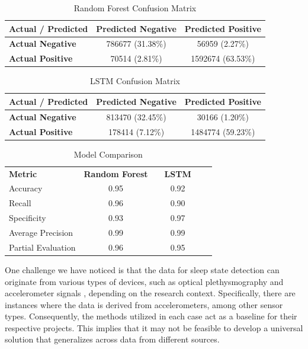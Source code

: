 \documentclass{article}
\begin{document}
\begin{table}[h]
    \centering
    \caption{Random Forest Confusion Matrix}
    \label{tab:random_forest_confusion_matrix}
    \begin{tabular}{lcc}
        \hline
        \textbf{Actual / Predicted} & \textbf{Predicted Negative} & \textbf{Predicted Positive} \\
        \hline
        \textbf{Actual Negative} & 786677 (31.38\%) & 56959 (2.27\%) \\
        \textbf{Actual Positive} & 70514 (2.81\%) & 1592674 (63.53\%) \\
        \hline
    \end{tabular}
\end{table}


\begin{table}[h]
    \centering
    \caption{LSTM Confusion Matrix}
    \label{tab:lstm_confusion_matrix}
    \begin{tabular}{lcc}
        \hline
        \textbf{Actual / Predicted} & \textbf{Predicted Negative} & \textbf{Predicted Positive} \\
        \hline
        \textbf{Actual Negative} & 813470 (32.45\%) & 30166 (1.20\%) \\
        \textbf{Actual Positive} & 178414 (7.12\%) & 1484774 (59.23\%) \\
        \hline
    \end{tabular}
\end{table}

\begin{table}[h]
    \centering
    \caption{Model Comparison}
    \label{tab:model_comparison}
    \begin{tabular}{lccccc}
        \hline
        \textbf{Metric} & \textbf{Random Forest} & & \textbf{LSTM} & \\
        \cline{2-5}
        Accuracy & 0.95 & & 0.92 & \\
        Recall & 0.96 & & 0.90 & \\
        Specificity & 0.93 & & 0.97 & \\
        Average Precision & 0.99 & & 0.99 & \\
        Partial Evaluation & 0.96 & & 0.95 & \\
        \hline
    \end{tabular}
\end{table}


One challenge we have noticed is that the data for sleep state detection can originate from various types of devices, such as optical plethysmography and accelerometer signals \cite{Beattie_2017}\cite{Fedorin2019}, depending on the research context. Specifically, there are instances where the data is derived from accelerometers, among other sensor types. Consequently, the methods utilized in each case act as a baseline for their respective projects. This implies that it may not be feasible to develop a universal solution that generalizes across data from different sources.
\end{document}
